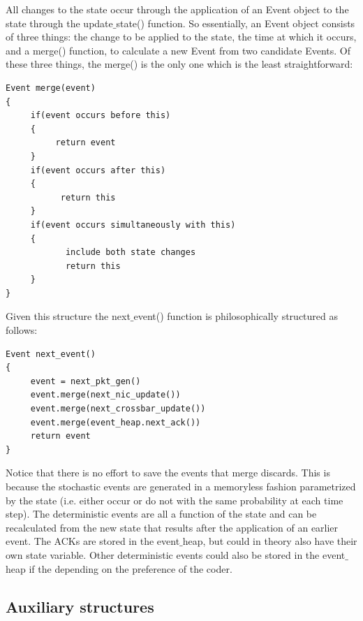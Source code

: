 \documentclass{IEEEtran}%
\begin{document}
All changes to the state occur through the application of an Event object to the state through the update$\_$state() function.  So essentially, an Event object consists of three things: the change to be applied to the state, the time at which it occurs, and a merge() function, to calculate a new Event from two candidate Events.  Of these three things, the merge() is the only one which is the least straightforward:
\begin{verbatim}
Event merge(event)
{
     if(event occurs before this)
     {
          return event
     }
     if(event occurs after this)
     {
           return this
     }
     if(event occurs simultaneously with this)
     {
            include both state changes
            return this
     }
}
\end{verbatim}

Given this structure the next$\_$event() function is philosophically structured as follows:

\begin{verbatim}
Event next_event()
{
     event = next_pkt_gen()
     event.merge(next_nic_update())
     event.merge(next_crossbar_update())
     event.merge(event_heap.next_ack())
     return event
}
\end{verbatim}

Notice that there is no effort to save the events that merge discards.  This is because the stochastic events are generated in a memoryless fashion parametrized by the state (i.e. either occur or do not with the same probability at each time step).  The deterministic events are all a function of the state and can be recalculated from the new state that results after the application of an earlier event.  The ACKs are stored in the event$\_$heap, but could in theory also have their own state variable.  Other deterministic events could also be stored in the event$\_$heap if the depending on the preference of the coder.



\subsection{Auxiliary structures}
\end{document}
